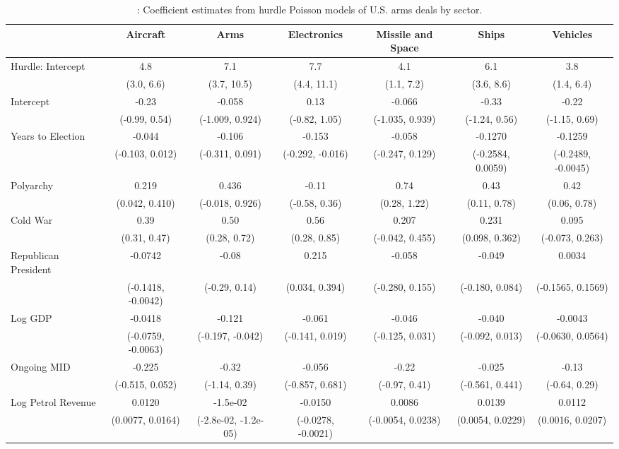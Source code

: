 \begin{table}[H]

\caption{\label{tab:pois-regs-sector}: Coefficient estimates from hurdle Poisson models of U.S. arms deals by sector.}
\centering
\fontsize{8}{10}\selectfont
\begin{tabular}[t]{lcccccc}
\toprule
  & Aircraft & Arms & Electronics & Missile and Space & Ships & Vehicles\\
\midrule
Hurdle: Intercept & 4.8 & 7.1 & 7.7 & 4.1 & 6.1 & 3.8\\
 & (3.0, 6.6) & (3.7, 10.5) & (4.4, 11.1) & (1.1, 7.2) & (3.6, 8.6) & (1.4, 6.4)\\
Intercept & -0.23 & -0.058 & 0.13 & -0.066 & -0.33 & -0.22\\
 & (-0.99, 0.54) & (-1.009, 0.924) & (-0.82, 1.05) & (-1.035, 0.939) & (-1.24, 0.56) & (-1.15, 0.69)\\
Years to Election & -0.044 & -0.106 & -0.153 & -0.058 & -0.1270 & -0.1259\\
 & (-0.103, 0.012) & (-0.311, 0.091) & (-0.292, -0.016) & (-0.247, 0.129) & (-0.2584, 0.0059) & (-0.2489, -0.0045)\\
Polyarchy & 0.219 & 0.436 & -0.11 & 0.74 & 0.43 & 0.42\\
 & (0.042, 0.410) & (-0.018, 0.926) & (-0.58, 0.36) & (0.28, 1.22) & (0.11, 0.78) & (0.06, 0.78)\\
Cold War & 0.39 & 0.50 & 0.56 & 0.207 & 0.231 & 0.095\\
 & (0.31, 0.47) & (0.28, 0.72) & (0.28, 0.85) & (-0.042, 0.455) & (0.098, 0.362) & (-0.073, 0.263)\\
Republican President & -0.0742 & -0.08 & 0.215 & -0.058 & -0.049 & 0.0034\\
 & (-0.1418, -0.0042) & (-0.29, 0.14) & (0.034, 0.394) & (-0.280, 0.155) & (-0.180, 0.084) & (-0.1565, 0.1569)\\
Log GDP & -0.0418 & -0.121 & -0.061 & -0.046 & -0.040 & -0.0043\\
 & (-0.0759, -0.0063) & (-0.197, -0.042) & (-0.141, 0.019) & (-0.125, 0.031) & (-0.092, 0.013) & (-0.0630, 0.0564)\\
Ongoing MID & -0.225 & -0.32 & -0.056 & -0.22 & -0.025 & -0.13\\
 & (-0.515, 0.052) & (-1.14, 0.39) & (-0.857, 0.681) & (-0.97, 0.41) & (-0.561, 0.441) & (-0.64, 0.29)\\
Log Petrol Revenue & 0.0120 & -1.5e-02 & -0.0150 & 0.0086 & 0.0139 & 0.0112\\
 & (0.0077, 0.0164) & (-2.8e-02, -1.2e-05) & (-0.0278, -0.0021) & (-0.0054, 0.0238) & (0.0054, 0.0229) & (0.0016, 0.0207)\\

\end{tabular}
\end{table}
